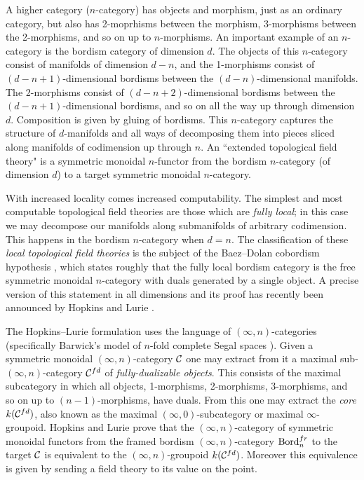 \documentclass[a4paper]{amsart}
\begin{document}
A higher category ($n$-category) has objects and morphism, just as an ordinary category, but also has 2-moprhisms between the morphism, 3-morphisms between the 2-morphisms, and so on up to $n$-morphisms. An important example of an $n$-category is the bordism category of dimension $d$. The objects of this $n$-category consist of manifolds of dimension $d-n$, and the 1-morphisms consist of $(d-n +1)$-dimensional bordisms between the $(d-n)$-dimensional manifolds. The 2-morphisms consist of $(d-n +2)$-dimensional bordisms between the $(d-n+1)$-dimensional bordisms, and so on all the way up through dimension $d$. Composition is given by gluing of bordisms. 
This $n$-category captures the structure of $d$-manifolds and all ways of decomposing them into pieces sliced along manifolds of codimension up through $n$. An ``extended  topological field theory" is a symmetric monoidal $n$-functor from the bordism $n$-category (of dimension $d$) to a target symmetric monoidal $n$-category. 

With increased locality comes increased computability. The simplest and most computable topological field theories are those which are {\em fully local}; in this case we may decompose our manifolds along submanifolds of arbitrary codimension. This happens in the bordism $n$-category when $d=n$. The classification of these {\em local topological field theories} is the subject of the Baez--Dolan cobordism hypothesis \cite{MR1355899}, which states roughly that the fully local bordism category is the free symmetric monoidal $n$-category with duals generated by a single object. A precise version of this statement in all dimensions and its proof has recently been announced by Hopkins and Lurie \cite{MR2555928}.

The Hopkins--Lurie formulation uses the language of $(\infty, n)$-categories (specifically Barwick's model of $n$-fold complete Segal spaces \cite{Barwick:thesis}). Given a symmetric monoidal $(\infty, n)$-category $\mathcal C$ one may extract from it a maximal sub-$(\infty,n)$-category $\mathcal C^{fd}$ of {\em fully-dualizable objects}. This consists of the maximal subcategory in which  all objects, 1-morphisms, 2-morphisms, 3-morphisms, and so on up to $(n-1)$-morphisms, have duals. 
From this one may extract the {\em core} $k(\mathcal C^{fd})$, also known as the maximal $(\infty,0)$-subcategory or maximal $\infty$-groupoid.
Hopkins and Lurie prove that the $(\infty,n)$-category of symmetric monoidal functors from the framed bordism $(\infty,n)$-category $\mathrm{Bord}^{fr}_n$ to the target $\mathcal C$ is equivalent to the $(\infty,n)$-groupoid $k(\mathcal C^{fd})$.  Moreover this equivalence is given by sending a field theory to its value on the point.
\end{document}
